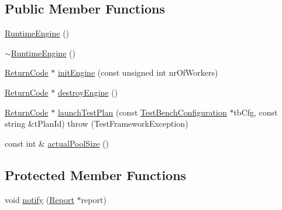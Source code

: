 \subsection*{Public Member Functions}
\begin{DoxyCompactItemize}
\item 
\hyperlink{classit_1_1testbench_1_1rte_1_1RuntimeEngine_a271ee0cebed5c58a6d6c4dcbdbdd0a3f}{Runtime\-Engine} ()
\item 
\hyperlink{classit_1_1testbench_1_1rte_1_1RuntimeEngine_ae21943cce382b49d76f010b23b87593f}{$\sim$\-Runtime\-Engine} ()
\item 
\hyperlink{structit_1_1testbench_1_1data_1_1ReturnCode}{Return\-Code} $\ast$ \hyperlink{classit_1_1testbench_1_1rte_1_1RuntimeEngine_a9ef8538eeb35100b8233ce63b5c66e52}{init\-Engine} (const unsigned int nr\-Of\-Workers)
\item 
\hyperlink{structit_1_1testbench_1_1data_1_1ReturnCode}{Return\-Code} $\ast$ \hyperlink{classit_1_1testbench_1_1rte_1_1RuntimeEngine_a4e0ac12a42708075cf2c6ff7252e3cf2}{destroy\-Engine} ()
\item 
\hyperlink{structit_1_1testbench_1_1data_1_1ReturnCode}{Return\-Code} $\ast$ \hyperlink{classit_1_1testbench_1_1rte_1_1RuntimeEngine_a608adae95c08fd4f2768aaab5a1e7379}{launch\-Test\-Plan} (const \hyperlink{classit_1_1testbench_1_1data_1_1TestBenchConfiguration}{Test\-Bench\-Configuration} $\ast$tb\-Cfg, const string \&t\-Plan\-Id)  throw (\-Test\-Framework\-Exception)
\item 
const int \& \hyperlink{classit_1_1testbench_1_1rte_1_1RuntimeEngine_a9afa1689d2cdae48dfcf8120afdc5092}{actual\-Pool\-Size} ()
\end{DoxyCompactItemize}
\subsection*{Protected Member Functions}
\begin{DoxyCompactItemize}
\item 
void \hyperlink{classit_1_1testbench_1_1rte_1_1RuntimeEngine_a9e1aaf1a127ea1f9242a4c67acbe70df}{notify} (\hyperlink{classit_1_1testbench_1_1data_1_1Report}{Report} $\ast$report)
\end{DoxyCompactItemize}
